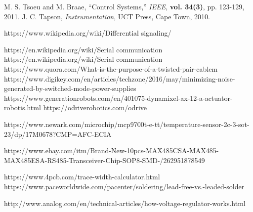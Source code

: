 \begin{thebibliography}{5}
 M. S. Tsoeu and M. Braae, ``Control Systems,'' \emph{IEEE}, {\bf vol. 34(3)}, pp. 123-129, 2011.
 J. C. Tapson, \emph{Instrumentation}, UCT Press, Cape Town, 2010.

 https://www.wikipedia.org/wiki/Differential signaling/



https://en.wikipedia.org/wiki/Serial communication
https://en.wikipedia.org/wiki/Serial communication
https://www.quora.com/What-is-the-purpose-of-a-twisted-pair-cablem
https://www.digikey.com/en/articles/techzone/2016/may/minimizing-noise-generated-by-switched-mode-power-supplies
https://www.generationrobots.com/en/401075-dynamixel-ax-12-a-actuator-robotis.html
https://odriverobotics.com/odrive


https://www.newark.com/microchip/mcp9700t-e-tt/temperature-sensor-2c-3-sot-23/dp/17M0678?CMP=AFC-ECIA


https://www.ebay.com/itm/Brand-New-10pcs-MAX485CSA-MAX485-MAX485ESA-RS485-Transceiver-Chip-SOP8-SMD-/262951878549

https://www.4pcb.com/trace-width-calculator.html
https://www.paceworldwide.com/pacenter/soldering/lead-free-vs.-leaded-solder 




http://www.analog.com/en/technical-articles/how-voltage-regulator-works.html


\end{thebibliography}


